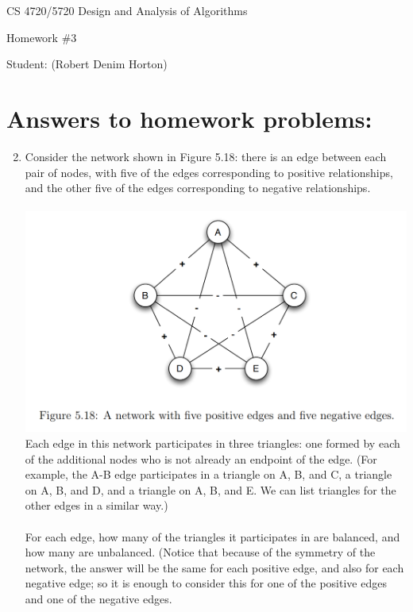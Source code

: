 \documentclass[11pt]{article}
\begin{document}
 

\rhead{\today}

\begin{center}\begin{Large}
CS 4720/5720 Design and Analysis of Algorithms

Homework \#3

Student: (Robert Denim Horton)
\end{Large}
\end{center}


\section*{Answers to homework problems:}

\begin{enumerate}
\setcounter{enumi}{1}
\item Consider the network shown in Figure 5.18: there is an edge between each pair of nodes, with five of the edges corresponding to positive relationships, and the other five of the edges corresponding to negative relationships.\\\\
\includegraphics[scale=1]{Figure_5_18}\\
Each edge in this network participates in three triangles: one formed by each of the additional nodes who is not already an endpoint of the edge. (For example, the A-B edge participates in a triangle on A, B, and C, a triangle on A, B, and D, and a triangle on A, B, and E. We can list triangles for the other edges in a similar way.)\\\\
For each edge, how many of the triangles it participates in are balanced, and how many are unbalanced. (Notice that because of the symmetry of the network, the answer will be the same for each positive edge, and also for each negative edge; so it is enough to consider this for one of the positive edges and one of the negative edges.\\\\

\end{enumerate}
\end{document}
